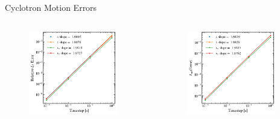 \documentclass[aspectratio=169, 16pt]{beamer}
\begin{document}
\begin{frame}{Cyclotron Motion Errors}
  \vfill{}
  \begin{columns}
    \centering
      \begin{figure}[H]
        \includegraphics[width=0.9\textwidth]{figs/cyclotron_l2_error.png}
      \end{figure}
      \begin{figure}[H]
        \includegraphics[width=0.9\textwidth]{figs/cyclotron_error.png}
      \end{figure}
  \end{columns}
\end{frame}
\end{document}
